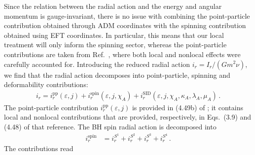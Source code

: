 \documentclass[prd,superscriptaddress,preprintnumbers,tightenlines,nofootinbib, eqsecnum]{revtex4-2}
\begin{document}
Since the relation between the radial action and the energy and angular momentum is gauge-invariant, there is no issue with combining the point-particle contribution obtained through ADM coordinates with the spinning contribution obtained using EFT coordinates. In particular, this means that our local treatment will only inform the spinning sector, whereas the point-particle contributions are taken from Ref.~\cite{Trestini:2025yyc}, where both local and nonlocal effects were carefully accounted for.
%
Introducing the reduced radial action $i_r=I_r/(G m^2 \nu)$, we find that the radial action decomposes into point-particle, spinning and deformability contributions:
\begin{align}\label{eq:ir_decomposition_pp_spin_SID}
    i_r = i_r^\text{pp}(\varepsilon,j) + i_r^\text{spin}(\varepsilon,j,\chi_A) + i_r^\text{SID}(\varepsilon,j,\chi_A,\kappa_A,\lambda_A,\mu_A)\,.
\end{align}
 The point-particle contribution $i_r^\text{pp}(\varepsilon,j)$ is provided in (4.49b) of \cite{Trestini:2025yyc}; it contains local and nonlocal contributions that are provided, respectively,  in Eqs.~(3.9) and  (4.48) of that reference. The BH spin radial action is decomposed into 
\begin{align} \label{eq:spin_ir_decomposition_S1234}
    i_r^\text{spin} &= i_r^{S^1} + i_r^{S^2} + i_r^{S^3}  +i_r^{S^4}   \,. 
\end{align}
The contributions read
\end{document}
